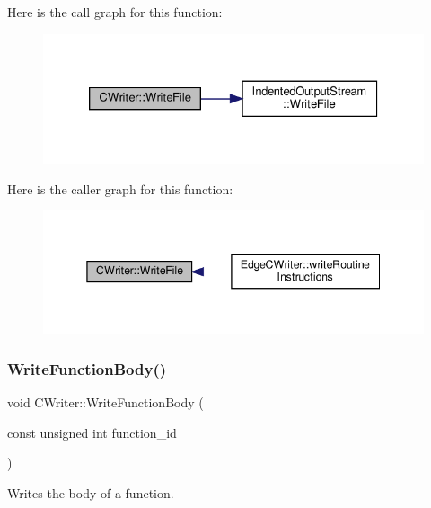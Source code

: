 Here is the call graph for this function\+:
\nopagebreak
\begin{figure}[H]
\begin{center}
\leavevmode
\includegraphics[width=326pt]{d3/d59/classCWriter_ad526446c6dd856accaca4a90b3a64f25_cgraph}
\end{center}
\end{figure}
Here is the caller graph for this function\+:
\nopagebreak
\begin{figure}[H]
\begin{center}
\leavevmode
\includegraphics[width=345pt]{d3/d59/classCWriter_ad526446c6dd856accaca4a90b3a64f25_icgraph}
\end{center}
\end{figure}
\mbox{\label{classCWriter_a7fa84e0feec4e832e2f2119e97cd7a3c}} 
\subsubsection{\texorpdfstring{Write\+Function\+Body()}{WriteFunctionBody()}}
{\footnotesize\ttfamily void C\+Writer\+::\+Write\+Function\+Body (\begin{DoxyParamCaption}\item[{const unsigned int}]{function\+\_\+id }\end{DoxyParamCaption})\hspace{0.3cm}{\ttfamily [virtual]}}



Writes the body of a function. 


